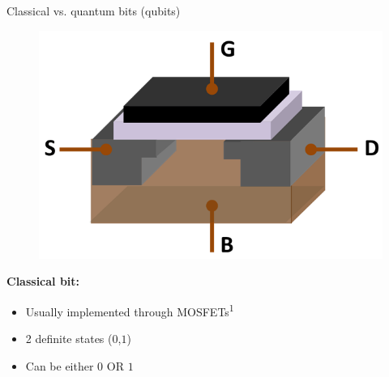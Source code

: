 \documentclass[10pt]{beamer}
\begin{document}
{
\begin{frame}[fragile]{Classical vs. quantum bits (qubits)}

\begin{figure}
\includegraphics[scale=0.3]{MOSFET.png}
\end{figure}
\vspace{-0.3cm}
\flushleft
\textbf{Classical bit:}
\begin{itemize}
\item Usually implemented through MOSFETs\textsuperscript{1}
\item 2 definite states ($0$,$1$)
\item Can be either $0$ OR $1$
\end{itemize}

\end{frame}
}
\end{document}
